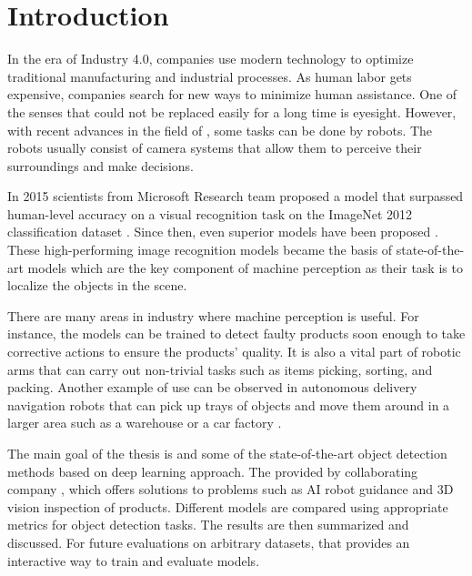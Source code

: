 \chapter{Introduction}

In the era of Industry 4.0, companies use modern technology to optimize
traditional manufacturing and industrial processes. As human labor gets expensive,
companies search for new ways to minimize human assistance. One of the senses
that could not be replaced easily for a long time is eyesight. However, with
recent advances in the field of , some tasks can be done by
robots. The robots usually consist of camera systems that allow them to
perceive their surroundings and make decisions.

In 2015 scientists from Microsoft Research team proposed a 
model \cite{surp2015} that surpassed human-level accuracy on a visual
recognition task on the ImageNet 2012 classification dataset \cite{imagenet}.
Since then, even superior models have been proposed \cite{resnet, efficientnet}.
These high-performing image recognition models became the basis of
state-of-the-art  models which are the key component of
machine perception as their task is to localize the objects in the scene.

There are many areas in industry where machine perception is useful. For
instance, the models can be trained to detect faulty products soon enough to
take corrective actions to ensure the products' quality. It is also a vital part
of robotic arms that can carry out non-trivial tasks such as items picking,
sorting, and packing. Another example of use can be observed in autonomous
delivery navigation robots that can pick up trays of objects and move them
around in a larger area such as a warehouse or a car factory \cite{bmw}.

The main goal of the thesis is  and  some of
the state-of-the-art object detection methods based on deep learning approach.
The  provided by
collaborating company , which offers solutions to problems
such as AI robot guidance and 3D vision inspection of products. Different models
are compared using appropriate metrics for object detection tasks. The results
are then summarized and discussed. For future evaluations on arbitrary datasets,
 that provides an interactive way to train
and evaluate models.

